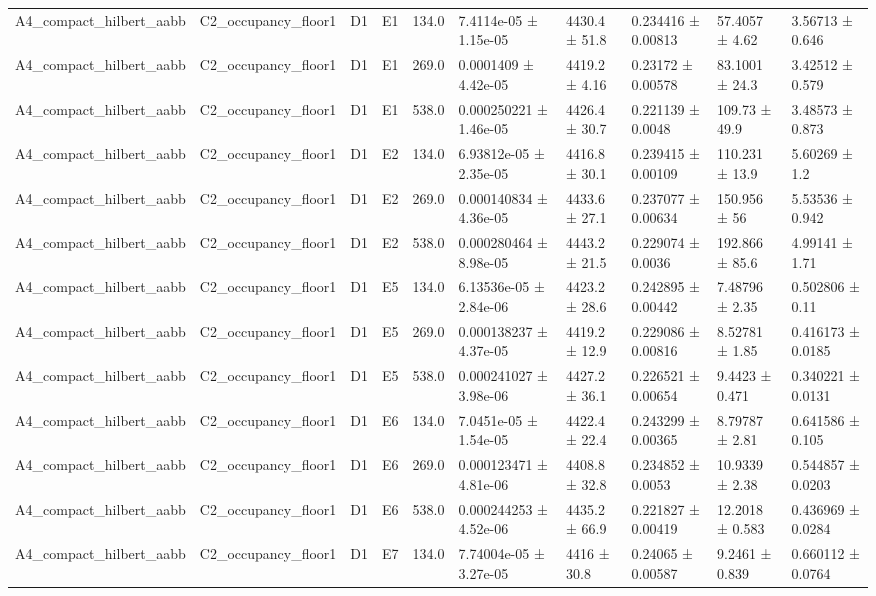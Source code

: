 \begin{table}
\begin{tabular}{llllllllll}
A4\_compact\_hilbert\_aabb & C2\_occupancy\_floor1 & D1 & E1 & 134.0 & 7.4114e-05 ± 1.15e-05 & 4430.4 ± 51.8 & 0.234416 ± 0.00813 & 57.4057 ± 4.62 & 3.56713 ± 0.646 \\
A4\_compact\_hilbert\_aabb & C2\_occupancy\_floor1 & D1 & E1 & 269.0 & 0.0001409 ± 4.42e-05 & 4419.2 ± 4.16 & 0.23172 ± 0.00578 & 83.1001 ± 24.3 & 3.42512 ± 0.579 \\
A4\_compact\_hilbert\_aabb & C2\_occupancy\_floor1 & D1 & E1 & 538.0 & 0.000250221 ± 1.46e-05 & 4426.4 ± 30.7 & 0.221139 ± 0.0048 & 109.73 ± 49.9 & 3.48573 ± 0.873 \\
A4\_compact\_hilbert\_aabb & C2\_occupancy\_floor1 & D1 & E2 & 134.0 & 6.93812e-05 ± 2.35e-05 & 4416.8 ± 30.1 & 0.239415 ± 0.00109 & 110.231 ± 13.9 & 5.60269 ± 1.2 \\
A4\_compact\_hilbert\_aabb & C2\_occupancy\_floor1 & D1 & E2 & 269.0 & 0.000140834 ± 4.36e-05 & 4433.6 ± 27.1 & 0.237077 ± 0.00634 & 150.956 ± 56 & 5.53536 ± 0.942 \\
A4\_compact\_hilbert\_aabb & C2\_occupancy\_floor1 & D1 & E2 & 538.0 & 0.000280464 ± 8.98e-05 & 4443.2 ± 21.5 & 0.229074 ± 0.0036 & 192.866 ± 85.6 & 4.99141 ± 1.71 \\
A4\_compact\_hilbert\_aabb & C2\_occupancy\_floor1 & D1 & E5 & 134.0 & 6.13536e-05 ± 2.84e-06 & 4423.2 ± 28.6 & 0.242895 ± 0.00442 & 7.48796 ± 2.35 & 0.502806 ± 0.11 \\
A4\_compact\_hilbert\_aabb & C2\_occupancy\_floor1 & D1 & E5 & 269.0 & 0.000138237 ± 4.37e-05 & 4419.2 ± 12.9 & 0.229086 ± 0.00816 & 8.52781 ± 1.85 & 0.416173 ± 0.0185 \\
A4\_compact\_hilbert\_aabb & C2\_occupancy\_floor1 & D1 & E5 & 538.0 & 0.000241027 ± 3.98e-06 & 4427.2 ± 36.1 & 0.226521 ± 0.00654 & 9.4423 ± 0.471 & 0.340221 ± 0.0131 \\
A4\_compact\_hilbert\_aabb & C2\_occupancy\_floor1 & D1 & E6 & 134.0 & 7.0451e-05 ± 1.54e-05 & 4422.4 ± 22.4 & 0.243299 ± 0.00365 & 8.79787 ± 2.81 & 0.641586 ± 0.105 \\
A4\_compact\_hilbert\_aabb & C2\_occupancy\_floor1 & D1 & E6 & 269.0 & 0.000123471 ± 4.81e-06 & 4408.8 ± 32.8 & 0.234852 ± 0.0053 & 10.9339 ± 2.38 & 0.544857 ± 0.0203 \\
A4\_compact\_hilbert\_aabb & C2\_occupancy\_floor1 & D1 & E6 & 538.0 & 0.000244253 ± 4.52e-06 & 4435.2 ± 66.9 & 0.221827 ± 0.00419 & 12.2018 ± 0.583 & 0.436969 ± 0.0284 \\
A4\_compact\_hilbert\_aabb & C2\_occupancy\_floor1 & D1 & E7 & 134.0 & 7.74004e-05 ± 3.27e-05 & 4416 ± 30.8 & 0.24065 ± 0.00587 & 9.2461 ± 0.839 & 0.660112 ± 0.0764 \\

\end{tabular}
\end{table}
